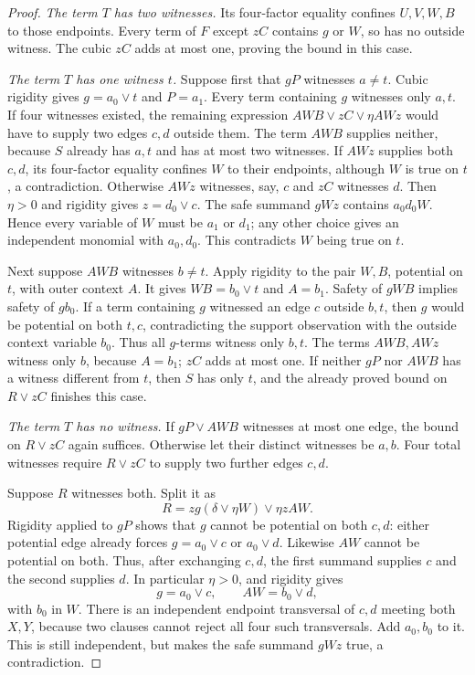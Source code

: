 \documentclass[11pt]{article}
\theoremstyle{definition}
\theoremstyle{remark}
\begin{document}
\begin{proof}
\emph{The term $T$ has two witnesses.}
Its four-factor equality confines $U,V,W,B$ to those endpoints. Every term of $F$ except $zC$ contains $g$ or $W$, so has no outside witness. The cubic $zC$ adds at most one, proving the bound in this case.

\emph{The term $T$ has one witness $t$.}
Suppose first that $gP$ witnesses $a\ne t$. Cubic rigidity gives $g=a_0\vee t$ and $P=a_1$. Every term containing $g$ witnesses only $a,t$. If four witnesses existed, the remaining expression $AWB\vee zC\vee\eta AWz$ would have to supply two edges $c,d$ outside them. The term $AWB$ supplies neither, because $S$ already has $a,t$ and has at most two witnesses. If $AWz$ supplies both $c,d$, its four-factor equality confines $W$ to their endpoints, although $W$ is true on $t$, a contradiction. Otherwise $AWz$ witnesses, say, $c$ and $zC$ witnesses $d$. Then $\eta>0$ and rigidity gives $z=d_0\vee c$. The safe summand $gWz$ contains $a_0d_0W$. Hence every variable of $W$ must be $a_1$ or $d_1$; any other choice gives an independent monomial with $a_0,d_0$. This contradicts $W$ being true on $t$.

Next suppose $AWB$ witnesses $b\ne t$. Apply rigidity to the pair $W,B$, potential on $t$, with outer context $A$. It gives $WB=b_0\vee t$ and $A=b_1$. Safety of $gWB$ implies safety of $gb_0$. If a term containing $g$ witnessed an edge $c$ outside $b,t$, then $g$ would be potential on both $t,c$, contradicting the support observation with the outside context variable $b_0$. Thus all $g$-terms witness only $b,t$. The terms $AWB,AWz$ witness only $b$, because $A=b_1$; $zC$ adds at most one. If neither $gP$ nor $AWB$ has a witness different from $t$, then $S$ has only $t$, and the already proved bound on $R\vee zC$ finishes this case.

\emph{The term $T$ has no witness.}
If $gP\vee AWB$ witnesses at most one edge, the bound on $R\vee zC$ again suffices. Otherwise let their distinct witnesses be $a,b$. Four total witnesses require $R\vee zC$ to supply two further edges $c,d$.

Suppose $R$ witnesses both. Split it as
\[
 R=z g(\delta\vee\eta W)\vee\eta zAW.
\]
Rigidity applied to $gP$ shows that $g$ cannot be potential on both $c,d$: either potential edge already forces $g=a_0\vee c$ or $a_0\vee d$. Likewise $AW$ cannot be potential on both. Thus, after exchanging $c,d$, the first summand supplies $c$ and the second supplies $d$. In particular $\eta>0$, and rigidity gives
\[
 g=a_0\vee c,\qquad AW=b_0\vee d,
\]
with $b_0$ in $W$. There is an independent endpoint transversal of $c,d$ meeting both $X,Y$, because two clauses cannot reject all four such transversals. Add $a_0,b_0$ to it. This is still independent, but makes the safe summand $gWz$ true, a contradiction.


\end{proof}
\end{document}

